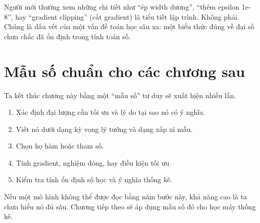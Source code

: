 Người mới thường xem những chi tiết như ``ép width dương'', ``thêm epsilon 1e-8'', hay ``gradient clipping'' (cắt gradient) là tiểu tiết lập trình. Không phải. Chúng là dấu vết của một vấn đề toán học sâu xa: một biểu thức đúng về đại số chưa chắc đã ổn định trong tính toán số.

\section{Mẫu số chuẩn cho các chương sau}

Ta kết thúc chương này bằng một ``mẫu số'' tư duy sẽ xuất hiện nhiều lần.

\begin{enumerate}
\item Xác định đại lượng cần tối ưu và lý do tại sao nó có ý nghĩa.
\item Viết nó dưới dạng kỳ vọng lý tưởng và dạng xấp xỉ mẫu.
\item Chọn họ hàm hoặc tham số.
\item Tính gradient, nghiệm đóng, hay điều kiện tối ưu.
\item Kiểm tra tính ổn định số học và ý nghĩa thống kê.
\end{enumerate}

Nếu một mô hình không thể được đọc bằng năm bước này, khả năng cao là ta chưa hiểu nó đủ sâu. Chương tiếp theo sẽ áp dụng mẫu số đó cho học máy thống kê.
